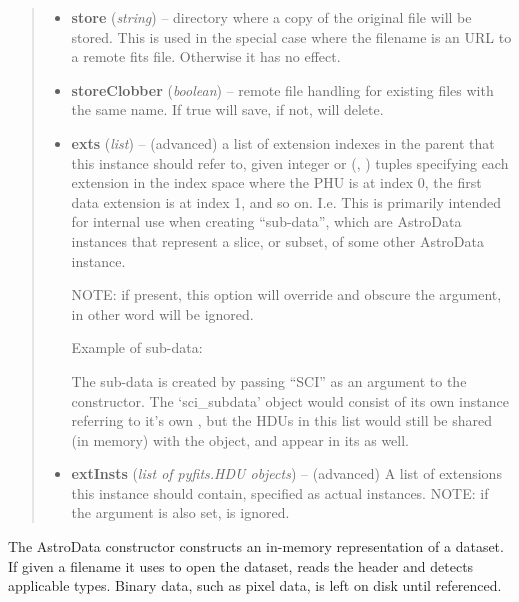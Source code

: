 \documentclass[letterpaper,10pt,english]{sphinxmanual}
\begin{document}
\begin{fulllineitems}
\begin{quote}
\begin{description}
\begin{itemize}
\item {} 
\textbf{store} (\emph{string}) -- directory where a copy of the original file will be 
stored.  This is used in the special case where the
filename is an URL to a remote fits file.  Otherwise it has
no effect.

\item {} 
\textbf{storeClobber} (\emph{boolean}) -- remote file handling for existing files with the
same name.  If true will save, if not, will delete.

\item {} 
\textbf{exts} (\emph{list}) -- 
(advanced) a list of extension indexes in the parent
 that this instance should refer to, given  integer or 
(, ) tuples specifying each extension in the 
index space where the PHU is at index 0, the first data extension
is at index 1, and so on. I.e. This is primarily intended for 
internal use when creating ``sub-data'', which are AstroData instances
that represent a slice, or subset, of some other AstroData instance.

NOTE: if present, this option will override and obscure the 
argument, in other word  will be ignored.

Example of sub-data:
\begin{quote}

\end{quote}

The sub-data is created by passing ``SCI'' as an argument to the
constructor. The `sci\_subdata' object would consist of its own 
 instance referring to it's own , but the HDUs in
this list would still be shared (in memory) with the  object,
and appear in its  as well.


\item {} 
\textbf{extInsts} (\emph{list of pyfits.HDU objects}) -- (advanced) A list of extensions this instance should contain,
specified as actual  instances. NOTE: if the  argument
is also set,  is ignored.

\end{itemize}

\end{description}\end{quote}

The AstroData constructor constructs an in-memory representation of a
dataset. If given a filename it uses  to open the dataset, reads
the header and detects applicable types. Binary data, such as pixel
data, is left on disk until referenced.

\end{fulllineitems}
\end{document}

